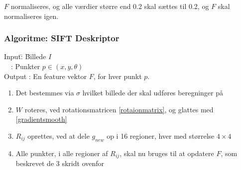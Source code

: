 $F$ normaliseres, og alle værdier større end 0.2 skal sættes til 0.2, og $F$ skal normaliseres igen.
\subsubsection*{Algoritme: SIFT Deskriptor}
\begin{tabbing}
Input\quad \= : \= Billede $I$\\
$\text{ }$ \> : \> Punkter $p \in (x, y, \theta)$ \\
Output \text{ } \> : \> En feature vektor $F$, for hver punkt $p$.
\end{tabbing}
\begin{enumerate}
\item Det bestemmes via $\sigma$ hvilket billede der skal udføres beregninger på
\item $W$ roteres, ved rotationsmatricen \eqref{rotaionmatrix}, og glattes med \eqref{gradientsmooth}
\item $R_{ij}$ oprettes, ved at dele $g_{new}$ op i 16 regioner, hver med størrelse $4\times4$
\item Alle punkter, i alle regioner af $R_{ij}$, skal nu bruges til at opdatere $F$, som beskrevet de 3 skridt ovenfor
\end{enumerate}